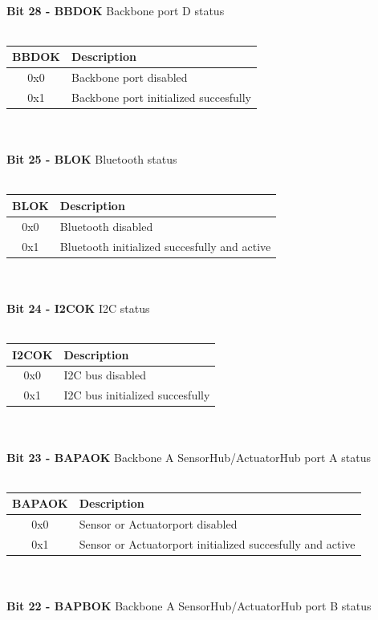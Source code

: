 \documentclass{article}
\begin{document}
\pagebreak\\
\textbf{Bit 28 - BBDOK} Backbone port D status\\\\
\begin{tabular}{|c|l|}
    \hline
   BBDOK & Description\\ \hline
   0x0 & Backbone port disabled\\ \hline
   0x1 & Backbone port initialized succesfully \\ \hline
\end{tabular}\\\\
\textbf{Bit 25 - BLOK} Bluetooth status\\\\
\begin{tabular}{|c|l|}
    \hline
   BLOK & Description\\ \hline
   0x0 & Bluetooth disabled\\ \hline
   0x1 & Bluetooth initialized succesfully and active\\ \hline
\end{tabular}\\\\
\textbf{Bit 24 - I2COK} I2C status\\\\
\begin{tabular}{|c|l|}
    \hline
   I2COK & Description\\ \hline
   0x0 & I2C bus disabled\\ \hline
   0x1 & I2C bus initialized succesfully \\ \hline
\end{tabular}\\\\
\textbf{Bit 23 - BAPAOK} Backbone A SensorHub/ActuatorHub port A status\\\\
\begin{tabular}{|c|l|}
    \hline
   BAPAOK & Description\\ \hline
   0x0 & Sensor or Actuatorport disabled\\ \hline
   0x1 & Sensor or Actuatorport initialized succesfully and active\\ \hline
\end{tabular}\\\\
\textbf{Bit 22 - BAPBOK} Backbone A SensorHub/ActuatorHub port B status\\\\
\end{document}
